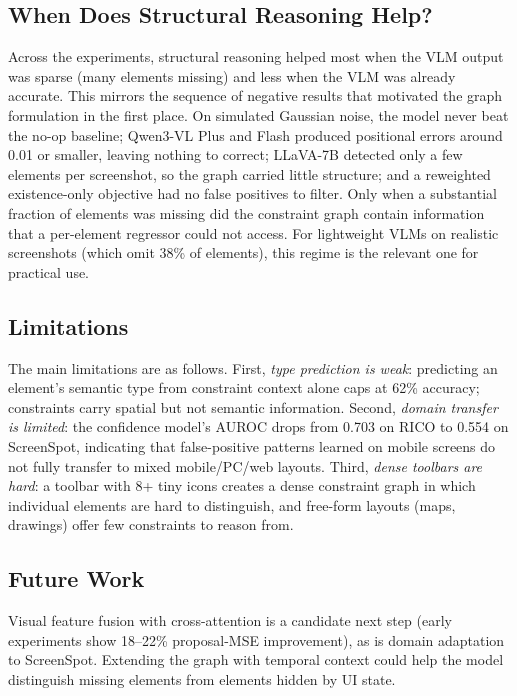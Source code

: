 \documentclass[11pt, letterpaper]{article}
\begin{document}
\subsection{When Does Structural Reasoning Help?}
Across the experiments, structural reasoning helped most when the VLM output
was sparse (many elements missing) and less when the VLM was already
accurate. This mirrors the sequence of negative results that motivated the
graph formulation in the first place. On simulated Gaussian noise, the model
never beat the no-op baseline; Qwen3-VL Plus and Flash produced positional
errors around 0.01 or smaller, leaving nothing to correct; LLaVA-7B detected
only a few elements per screenshot, so the graph carried little structure;
and a reweighted existence-only objective had no false positives to filter.
Only when a substantial fraction of elements was missing did the constraint
graph contain information that a per-element regressor could not access. For
lightweight VLMs on realistic screenshots (which omit 38\% of elements),
this regime is the relevant one for practical use.

\subsection{Limitations}
The main limitations are as follows. First, \emph{type prediction is weak}: predicting
an element's semantic type from constraint context alone caps at 62\%
accuracy; constraints carry spatial but not semantic information. Second,
\emph{domain transfer is limited}: the confidence model's AUROC drops from
0.703 on RICO to 0.554 on ScreenSpot, indicating that false-positive patterns
learned on mobile screens do not fully transfer to mixed mobile/PC/web
layouts. Third, \emph{dense toolbars are hard}: a toolbar with 8+ tiny icons
creates a dense constraint graph in which individual elements are hard to
distinguish, and free-form layouts (maps, drawings) offer few constraints to
reason from.

\subsection{Future Work}
Visual feature fusion with cross-attention is a candidate next step (early
experiments show 18--22\% proposal-MSE improvement), as is domain adaptation
to ScreenSpot. Extending the graph with temporal context could help the model
distinguish missing elements from elements hidden by UI state.
\end{document}
